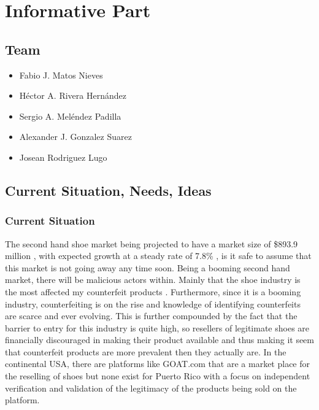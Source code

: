 \chapter{Informative Part}
\section{Team}
\begin{itemize}
    \item Fabio J. Matos Nieves
    \item Héctor A. Rivera Hernández
    \item Sergio A. Meléndez Padilla
    \item Alexander J. Gonzalez Suarez
    \item Josean Rodriguez Lugo
\end{itemize}
\section{Current Situation, Needs, Ideas}
\subsection{Current Situation}
\hspace{1cm} The second hand shoe market being projected to have a market size of \$893.9 million \cite{SecondHandDesigner}, with expected growth at a steady rate of 7.8\% \cite{SecondHandDesigner2022}, is it safe to assume that this market is not going away any time soon. Being a booming second hand market, there will be malicious actors within. Mainly that the shoe industry is the most affected my counterfeit products \cite{InfographicIndustriesMost2019}. Furthermore, since it is a booming industry, counterfeiting is on the rise and knowledge of identifying counterfeits are scarce and ever evolving. This is further compounded by the fact that the barrier to entry for this industry is quite high, so resellers of legitimate shoes are financially discouraged in making their product available and thus making it seem that counterfeit products are more prevalent then they actually are. In the continental USA, there are platforms like GOAT.com that are a market place for the reselling of shoes but none exist for Puerto Rico with a focus on independent verification and validation of the legitimacy of the products being sold on the platform.
